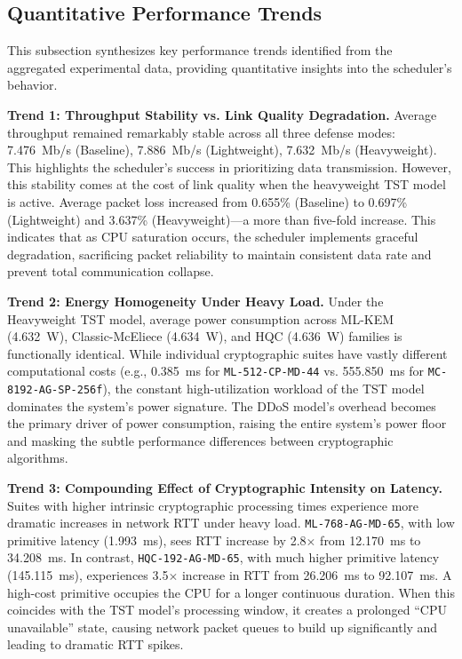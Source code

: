 \documentclass[sigconf,natbib=false]{acmart}
\begin{document}
\subsection{Quantitative Performance Trends}

This subsection synthesizes key performance trends identified from the aggregated experimental data, providing quantitative insights into the scheduler's behavior.

\textbf{Trend 1: Throughput Stability vs. Link Quality Degradation.} Average throughput remained remarkably stable across all three defense modes: 7.476~Mb/s (Baseline), 7.886~Mb/s (Lightweight), 7.632~Mb/s (Heavyweight). This highlights the scheduler's success in prioritizing data transmission. However, this stability comes at the cost of link quality when the heavyweight TST model is active. Average packet loss increased from 0.655\% (Baseline) to 0.697\% (Lightweight) and 3.637\% (Heavyweight)---a more than five-fold increase. This indicates that as CPU saturation occurs, the scheduler implements graceful degradation, sacrificing packet reliability to maintain consistent data rate and prevent total communication collapse.

\textbf{Trend 2: Energy Homogeneity Under Heavy Load.} Under the Heavyweight TST model, average power consumption across ML-KEM (4.632~W), Classic-McEliece (4.634~W), and HQC (4.636~W) families is functionally identical. While individual cryptographic suites have vastly different computational costs (e.g., 0.385~ms for \texttt{ML-512-CP-MD-44} vs. 555.850~ms for \texttt{MC-8192-AG-SP-256f}), the constant high-utilization workload of the TST model dominates the system's power signature. The DDoS model's overhead becomes the primary driver of power consumption, raising the entire system's power floor and masking the subtle performance differences between cryptographic algorithms.

\textbf{Trend 3: Compounding Effect of Cryptographic Intensity on Latency.} Suites with higher intrinsic cryptographic processing times experience more dramatic increases in network RTT under heavy load. \texttt{ML-768-AG-MD-65}, with low primitive latency (1.993~ms), sees RTT increase by 2.8$\times$ from 12.170~ms to 34.208~ms. In contrast, \texttt{HQC-192-AG-MD-65}, with much higher primitive latency (145.115~ms), experiences 3.5$\times$ increase in RTT from 26.206~ms to 92.107~ms. A high-cost primitive occupies the CPU for a longer continuous duration. When this coincides with the TST model's processing window, it creates a prolonged ``CPU unavailable'' state, causing network packet queues to build up significantly and leading to dramatic RTT spikes.
\end{document}
